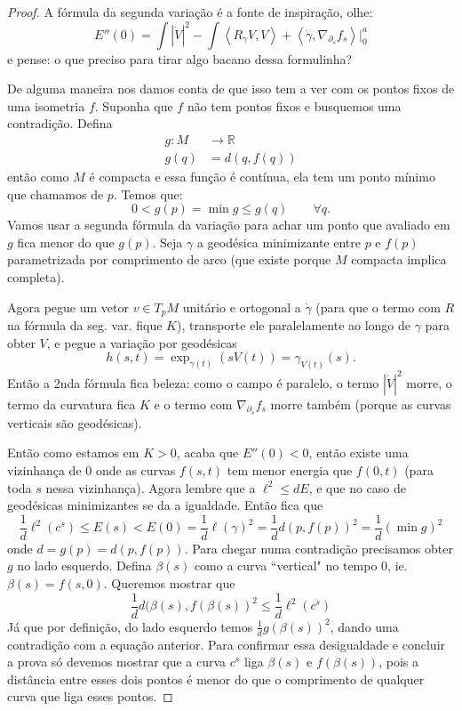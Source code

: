 \begin{proof}\leavevmode
       A fórmula da segunda variação é a fonte de inspiração, olhe:
\[E''(0)=\int |\dot V|^2-\int\left<R_ {\dot \gamma}V,V\right>+\left<\dot\gamma,\nabla_{\partial_s}f_s\right>|_{0}^a\]
e pense: o que preciso para tirar algo bacano dessa formulinha?

	De alguma maneira nos damos conta de que isso tem a ver com os pontos fixos de uma isometria \(f\). Suponha que \(f\) não tem pontos fixos e busquemos uma contradição. Defina
 \begin{align*}
	g: M &\longrightarrow \mathbb{R} \\
	g(q) &=d(q,f(q))
\end{align*}
então como \(M\) é compacta e essa função é contínua, ela tem um ponto mínimo que chamamos de \(p\). Temos que:
 \[0<g(p)=\operatorname{min}g\leq g(q)\qquad \forall q.\]
Vamos usar a segunda fórmula da variação para achar um ponto que avaliado em \(g\) fica menor do que \(g(p)\). Seja \(\gamma\) a geodésica minimizante entre \(p\) e \(f(p)\) parametrizada por comprimento de arco (que existe porque \(M\) compacta implica completa).

Agora pegue um vetor \(v \in T_pM\) unitário e ortogonal a \(\dot \gamma\) (para que o termo com \(R\) na fórmula da seg. var. fique \(K\)), transporte ele paralelamente ao longo de \(\gamma\) para obter \(V\), e pegue a variação por geodésicas
\[h(s,t)=\operatorname{exp}_{\gamma(t)}(sV(t))=\gamma_{V(t)}(s).\]
Então a 2nda fórmula fica beleza: como o campo é paralelo, o termo \(|\dot V|^2\) morre, o termo da curvatura fica \(K\) e o termo com \(\nabla_{\partial_s}f_s\) morre também (porque as curvas verticais são geodésicas).

Então como estamos em \(K>0\), acaba que \(E''(0)<0\), então existe uma vizinhança de \(0\)  onde as curvas \(f(s,t)\) tem menor energia que \(f(0,t)\) (para toda \(s\) nessa  vizinhança). Agora lembre que a \(\ell^2 \leq dE\), e que no caso de geodésicas minimizantes se da a igualdade. Então fica que
\[\frac{1}{d}\ell^2(c^s)\leq E(s)<E(0)=\frac{1}{d}\ell(\gamma)^2=\frac{1}{d}d(p,f(p))^2=\frac{1}{d}(\operatorname{min}g)^2\]
onde \(d=g(p)=d(p,f(p))\). Para chegar numa contradição precisamos obter \(g\) no lado esquerdo. Defina \(\beta(s)\) como a curva ``vertical" no tempo 0, ie. \(\beta(s)=f(s,0)\). Queremos mostrar que
\[\boxed{\frac{1}{d}d(\beta(s),f(\beta(s))^2\leq \frac{1}{d}\ell^2(c^s)}\]
Já que por definição, do lado esquerdo temos \(\frac{1}{d}g(\beta(s))^2\), dando uma contradição com a equação anterior. Para confirmar essa desigualdade e concluir a prova só devemos mostrar que a curva \(c^s\) liga \(\beta(s)\) e \(f(\beta(s))\), pois a distância entre esses dois pontos é menor do que o comprimento de qualquer curva que liga esses pontos.


\end{proof}
